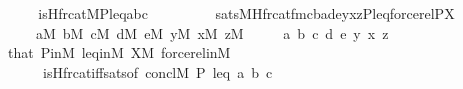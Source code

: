 \begin{isabellebody}
%
\endisadelimproof
%
\isatagproof
{}\isamarkupfalse%
\ {\isacharminus}{\kern0pt}\isanewline
\ \ \isamarkupfalse%
\ {}{\isacharcolon}{\kern0pt}{\isachardoublequoteopen}is{\isacharunderscore}{\kern0pt}Hfrc{\isacharunderscore}{\kern0pt}at{\isacharparenleft}{\kern0pt}{\isacharhash}{\kern0pt}{\isacharhash}{\kern0pt}M{\isacharcomma}{\kern0pt}P{\isacharcomma}{\kern0pt}leq{\isacharcomma}{\kern0pt}a{\isacharcomma}{\kern0pt}b{\isacharcomma}{\kern0pt}c{\isacharparenright}{\kern0pt}\ {\isasymlongleftrightarrow}\isanewline
\ \ \ \ \ \ \ \ sats{\isacharparenleft}{\kern0pt}M{\isacharcomma}{\kern0pt}Hfrc{\isacharunderscore}{\kern0pt}at{\isacharunderscore}{\kern0pt}fm{\isacharparenleft}{\kern0pt}{}{\isacharcomma}{\kern0pt}{}{\isacharcomma}{\kern0pt}{}{\isacharcomma}{\kern0pt}{}{\isacharcomma}{\kern0pt}{}{\isacharparenright}{\kern0pt}{\isacharcomma}{\kern0pt}{\isacharbrackleft}{\kern0pt}c{\isacharcomma}{\kern0pt}b{\isacharcomma}{\kern0pt}a{\isacharcomma}{\kern0pt}d{\isacharcomma}{\kern0pt}e{\isacharcomma}{\kern0pt}y{\isacharcomma}{\kern0pt}x{\isacharcomma}{\kern0pt}z{\isacharcomma}{\kern0pt}P{\isacharcomma}{\kern0pt}leq{\isacharcomma}{\kern0pt}forcerel{\isacharparenleft}{\kern0pt}P{\isacharcomma}{\kern0pt}X{\isacharparenright}{\kern0pt}{\isacharbrackright}{\kern0pt}{\isacharparenright}{\kern0pt}{\isachardoublequoteclose}\isanewline
\ \ \ \ \ {\isachardoublequoteopen}a{\isasymin}M{\isachardoublequoteclose}\ {\isachardoublequoteopen}b{\isasymin}M{\isachardoublequoteclose}\ {\isachardoublequoteopen}c{\isasymin}M{\isachardoublequoteclose}\ {\isachardoublequoteopen}d{\isasymin}M{\isachardoublequoteclose}\ {\isachardoublequoteopen}e{\isasymin}M{\isachardoublequoteclose}\ {\isachardoublequoteopen}y{\isasymin}M{\isachardoublequoteclose}\ {\isachardoublequoteopen}x{\isasymin}M{\isachardoublequoteclose}\ {\isachardoublequoteopen}z{\isasymin}M{\isachardoublequoteclose}\isanewline
\ \ \ \ \ a\ b\ c\ d\ e\ y\ x\ z\isanewline
\ \ \ \ \isamarkupfalse%
\ that\ P{\isacharunderscore}{\kern0pt}in{\isacharunderscore}{\kern0pt}M\ leq{\isacharunderscore}{\kern0pt}in{\isacharunderscore}{\kern0pt}M\ {\isacartoucheopen}X{\isasymin}M{\isacartoucheclose}\ forcerel{\isacharunderscore}{\kern0pt}in{\isacharunderscore}{\kern0pt}M\isanewline
\ \ \ \ \ \ is{\isacharunderscore}{\kern0pt}Hfrc{\isacharunderscore}{\kern0pt}at{\isacharunderscore}{\kern0pt}iff{\isacharunderscore}{\kern0pt}sats{\isacharbrackleft}{\kern0pt}of\ concl{\isacharcolon}{\kern0pt}M\ P\ leq\ a\ b\ c\ {}\ {}\ {}\ {}\ {}\isanewline

\end{isabellebody}
